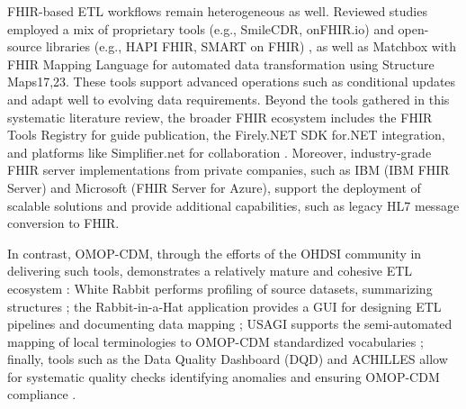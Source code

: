 FHIR-based ETL workflows remain heterogeneous as well. Reviewed studies employed a mix of proprietary tools (e.g., SmileCDR, onFHIR.io) \cite{ulgu_nationwide_2024,lenert_automated_2021,mishra_modified_2021,sinaci2023data,bialke_fhir_2022} and open-source libraries (e.g., HAPI FHIR, SMART on FHIR) \cite{marfoglia_towards_2025,bennett2023mimic,phelan_beyond_2024}, as well as Matchbox with FHIR Mapping Language for automated data transformation using Structure Maps17,23. These tools support advanced operations such as conditional updates and adapt well to evolving data requirements. Beyond the tools gathered in this systematic literature review, the broader FHIR ecosystem includes the FHIR Tools Registry for guide publication, the Firely.NET SDK \cite{noauthor_firely_net_sdk} for.NET integration, and platforms like Simplifier.net for collaboration \cite{firely_simplifier}. Moreover, industry-grade FHIR server implementations from private companies, such as IBM (IBM\textregistered{} FHIR\textregistered{} Server) and Microsoft (FHIR Server for Azure), support the deployment of scalable solutions and provide additional capabilities, such as legacy HL7 message conversion to FHIR.

In contrast, OMOP-CDM, through the efforts of the OHDSI community in delivering such tools, demonstrates a relatively mature and cohesive ETL ecosystem \cite{bhattacharjee_inspire_2024,rosenau_generation_2022}: White Rabbit performs profiling of source datasets, summarizing structures \cite{bhattacharjee_inspire_2024,papez_transforming_2023,almeida_methodology_2021,lamer_transforming_2021,papez_transforming_2021,khalid_standardized_2021,delanerolle_methodological_2022,rosenau_generation_2022}; the Rabbit-in-a-Hat application provides a GUI for designing ETL pipelines and documenting data mapping \cite{junior_integrating_2022,raventos_transforming_2023,bhattacharjee_inspire_2024,kiwuwa-muyingo_enabling_2023,papez_transforming_2023,tan_applying_2022,lamer_transforming_2021,papez_transforming_2021,khalid_standardized_2021,delanerolle_methodological_2022}; USAGI supports the semi-automated mapping of local terminologies to OMOP-CDM standardized vocabularies \cite{cai_advancing_2023,chechulina_semi-automated_2023,guo_development_2023,raventos_transforming_2023,bhattacharjee_inspire_2024,henke_assessing_2023,kiwuwa-muyingo_enabling_2023,papez_transforming_2023,almeida_methodology_2021,almeida_two-stage_2021,lamer_transforming_2021,papez_transforming_2021,khalid_standardized_2021,ward_omop_2024,carus_mapping_2023,oja_transforming_2023,delanerolle_methodological_2022,rosenau_generation_2022,sathappan_transformation_2021,sun_building_2021}; finally, tools such as the Data Quality Dashboard (DQD) and ACHILLES allow for systematic quality checks identifying anomalies and ensuring OMOP-CDM compliance \cite{kim_transforming_2021,paris_transformation_2021,bhattacharjee_inspire_2024,papez_transforming_2023,almeida_methodology_2021,biedermann_standardizing_2021,lamer_transforming_2021,papez_transforming_2021,khalid_standardized_2021,oja_transforming_2023}.

